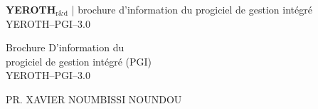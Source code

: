 \documentclass[a4paper, 10pt]{article}
\newcommand{\pos}{progiciel de gestion intégré\xspace}
\newcommand{\yerothrd}{\textcolor{yerothColorGreen}
			{\textsc{\textcolor{yerothColorRed}{YEROTH}}$_{\text{r\&d}}$\xspace}}
\newcommand{\yerothpgiblack}{YEROTH--PGI--$3.0$\xspace}
\newcommand{\myfullacademicname}{PR. XAVIER NOUMBISSI NOUNDOU\xspace}
\begin{document}
\thispagestyle{OnlyFirstPage}


{\bf \LARGE \yerothrd} {| \sc \scriptsize brochure d'information du \pos \yerothpgiblack}

\vspace{2.0em}

\begin{center}
{\LARGE Brochure D'information du \\
    \vspace{0.3em}
    progiciel de gestion intégré (PGI) \\
    \vspace{0.5em}
    \yerothpgiblack}
\end{center}

\vspace{2.0em}

\begin{center}
{\large \myfullacademicname}
\end{center}

\vspace{1.0em}
\end{document}
